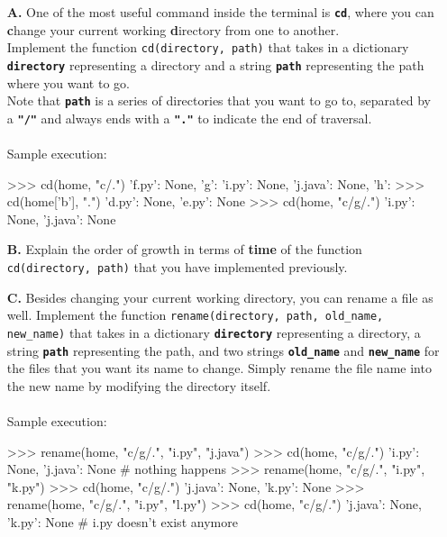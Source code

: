 \begin{enumerate}
\item[\textbf{A.}]
One of the most useful command inside the terminal is \texttt{\bfseries cd}, where you can \textbf{c}hange your 
current working \textbf{d}irectory from one to another. \\
Implement the function \colorbox{CornflowerBlue!20}{\texttt{cd(directory, path)}} that takes in a dictionary 
\texttt{\bfseries directory} representing a directory and a string \texttt{\bfseries path} representing the path 
where you want to go. \\
Note that \texttt{\bfseries path} is a series of directories that you want to go to, separated by a \texttt{\bfseries "/"} 
and always ends with a \texttt{\bfseries "."} to indicate the end of traversal. \\ \\
Sample execution:
\begin{python}
>>> cd(home, "c/.")
{'f.py': None, 'g': {'i.py': None, 'j.java': None}, 'h': {}}
>>> cd(home['b'], ".")
{'d.py': None, 'e.py': None}
>>> cd(home, "c/g/.")
{'i.py': None, 'j.java': None}
\end{python}
\begin{flushright}
    [4 marks]
\end{flushright}

\item[\textbf{B.}]
Explain the order of growth in terms of \textbf{time} of the function \colorbox{CornflowerBlue!20}{\texttt{cd(directory, path)}} that 
you have implemented previously.
\begin{flushright}
    [2 marks]
\end{flushright}

\item[\textbf{C.}]
Besides changing your current working directory, you can rename a file as well. Implement the function 
\colorbox{CornflowerBlue!20}{\texttt{rename(directory, path, old\_name, new\_name)}} that takes in a dictionary \texttt{\bfseries directory} representing a directory, 
a string \texttt{\bfseries path} representing the path, and two strings \texttt{\bfseries old\_name} and \texttt{\bfseries new\_name} for the files that you want its 
name to change. Simply rename the file name into the new name by modifying the directory itself. \\ \\
Sample execution:
\begin{python}
>>> rename(home, "c/g/.", "i.py", "j.java")
>>> cd(home, "c/g/.")
{'i.py': None, 'j.java': None} # nothing happens
>>> rename(home, "c/g/.", "i.py", "k.py")
>>> cd(home, "c/g/.")
{'j.java': None, 'k.py': None}
>>> rename(home, "c/g/.", "i.py", "l.py")
>>> cd(home, "c/g/.")
{'j.java': None, 'k.py': None} # i.py doesn't exist anymore
\end{python}
\begin{flushright}
    [5 marks]
\end{flushright}


\end{enumerate}
